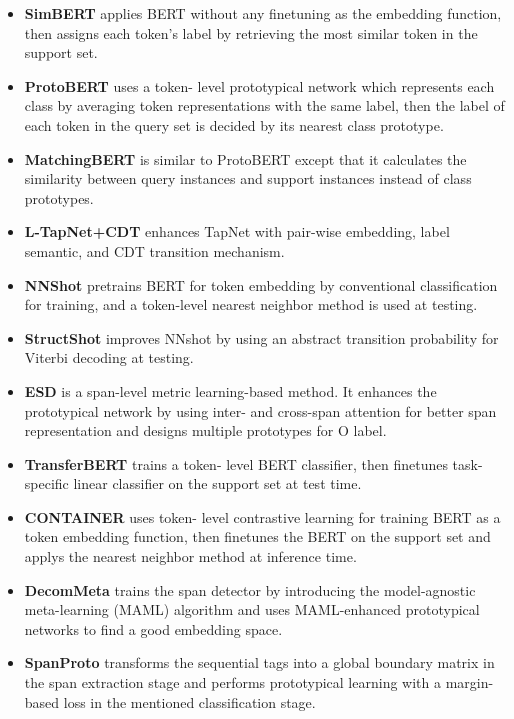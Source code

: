 \documentclass[sigconf,natbib=true,anonymous=False]{acmart}
\begin{document}
\begin{itemize}
\item {\textbf{SimBERT}} \cite{hou2020few} applies BERT
without any finetuning as the embedding function, then assigns each token’s label by retrieving the most similar token in the support set.

\item {\textbf{ProtoBERT}} \cite{fritzler2019few} uses a token-
level prototypical network \cite{snell2017prototypical} which represents each class by averaging token representations with the same label, then the label of each token in the query set is decided by its nearest class prototype.

\item {\textbf{MatchingBERT}} \cite{NIPS2016_90e13578} is similar to ProtoBERT except that it calculates the similarity between query instances and support instances instead of class prototypes.

\item {\textbf{L-TapNet+CDT}} \cite{hou2020few} enhances
TapNet with pair-wise embedding, label semantic, and CDT transition mechanism.

\item {\textbf{NNShot}} \cite{yang2020simple} pretrains
BERT for token embedding by conventional classification for training, and a token-level nearest neighbor method is used at testing. 

\item {\textbf{StructShot}} \cite{yang2020simple} improves
NNshot by using an abstract transition probability for Viterbi decoding at testing.

\item {\textbf{ESD}} \cite{wang2021enhanced} is a span-level metric learning-based method. It enhances the prototypical network by using inter- and cross-span attention for better span representation and designs multiple prototypes for O label. 

\item {\textbf{TransferBERT}} \cite{hou2020few} trains a token-
level BERT classifier, then finetunes task-specific linear classifier on the support set at test time.

\item {\textbf{CONTAINER}} \cite{das2021container} uses token-
level contrastive learning for training BERT as a token embedding function, then finetunes the BERT on the support set and applys the nearest neighbor method at inference time.

\item {\textbf{DecomMeta}} \cite{ma2022decomposed} trains the span detector by introducing the model-agnostic meta-learning (MAML) algorithm and uses MAML-enhanced prototypical networks to find a good embedding space.

\item {\textbf{SpanProto}} \cite{wang2022spanproto} transforms the sequential tags into a global boundary matrix in the span extraction stage and performs prototypical learning with a margin-based loss in the mentioned classification stage.

\end{itemize}
\end{document}
